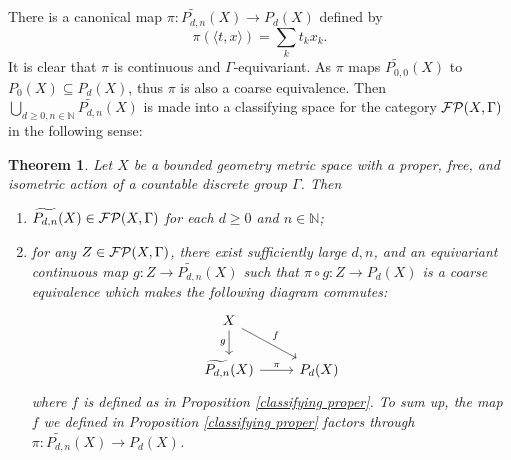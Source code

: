 \documentclass[11pt]{article}
\theoremstyle{definition}
\theoremstyle{plain}
\newtheorem{Thm}[Def]{Theorem}
\def\IN{\mathbb N}\def\IR{\mathbb R}\def\IE{\mathbb E}\def\IC{\mathbb C}\def\IL{\mathbb L}\def\IQ{\mathbb Q}\def\IA{\mathbb A}\def\IZ{\mathbb Z}
\def\MRdnX{\widetilde{P_{d,n}}(X)}
\def\Ga{\Gamma}
\begin{document}
There is a canonical map $\pi:\MRdnX\to P_d(X)$ defined by
$$\pi(\langle t,x\rangle)=\sum_{k}t_kx_k.$$
It is clear that $\pi$ is continuous and $\Ga$-equivariant. As $\pi$ maps $\widetilde{P_{0,0}}(X)$ to $P_0(X)\subseteq P_d(X)$, thus $\pi$ is also a coarse equivalence. Then $\bigcup_{d\geq0,n\in\IN}\MRdnX$ is made into a classifying space for the category $\F\P(X,\Ga)$ in the following sense:

\begin{Thm}\label{classify free and proper}
Let $X$ be a bounded geometry metric space with a proper, free, and isometric action of a countable discrete group $\Ga$. Then\begin{enumerate}
\item[(1)]$\MRdnX\in\F\P(X,\Ga)$ for each $d\geq 0$ and $n\in\IN$;
\item[(2)]for any $Z\in\F\P(X,\Ga)$, there exist sufficiently large $d,n$, and an equivariant continuous map $g: Z\to\MRdnX$ such that $\pi\circ g: Z\to P_d(X)$ is a coarse equivalence which makes the following diagram commutes:
$$\begin{tikzcd}
X\arrow[d,  "g"'] \arrow[dr,  "f"]\\
\MRdnX\arrow[r, "\pi"]             & P_d(X)   
\end{tikzcd}$$
where $f$ is defined as in Proposition \ref{classifying proper}. To sum up, the map $f$ we defined in Proposition \ref{classifying proper} factors through $\pi:\MRdnX\to P_d(X)$.
\end{enumerate}\end{Thm}
\end{document}
